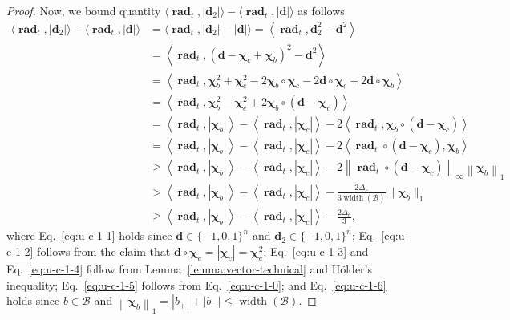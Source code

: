 \documentclass{article}
\newcommand{\B}{\mathcal B}
\DeclareMathOperator{\rank}{width}
\DeclareMathOperator{\rad}{rad}
\newcommand{\nor}[1]{\left\|#1\right\|}
\renewcommand{\vec}[1]{\boldsymbol{#1}}
\renewcommand{\odot}{\circ}
\begin{document}
\begin{proof}
Now, we bound  quantity $\langle \vec \rad_t, |\vec d_2| \rangle - \langle \vec \rad_t, |\vec d| \rangle$ as follows
\begin{align}
\langle \vec \rad_t, |\vec d_2| \rangle - \langle \vec \rad_t, |\vec d| \rangle &=
\langle \vec \rad_t, |\vec d_2|-|\vec d| \rangle = \left\langle \vec \rad_t, \vec d_2^2- \vec d^2 \right\rangle
\label{eq:u-c-1-1} \\
&= \left\langle \vec \rad_t, (\vec d-\vec \chi_c+\vec \chi_b)^2- \vec d^2 \right\rangle 
\nonumber \\
&= \left\langle \vec \rad_t, \vec \chi_b^2+\vec \chi_c^2-2\vec \chi_b\odot \vec \chi_c -
						  2\vec d \odot \vec \chi_c + 2\vec d\odot\vec \chi_b \right\rangle
\nonumber \\
&= \left\langle \vec \rad_t, \vec \chi_b^2 - \vec \chi_c^2+2\vec \chi_b\odot (\vec d-\vec \chi_c)\right\rangle
\label{eq:u-c-1-2}\\
&= \left\langle \vec \rad_t, |\vec\chi_b| \right\rangle
  -\left\langle \vec \rad_t, |\vec\chi_c| \right\rangle
  -2\left\langle \vec \rad_t, \vec \chi_b\odot (\vec d-\vec \chi_c) \right\rangle
  \nonumber \\
&= \left\langle \vec \rad_t, |\vec\chi_b| \right\rangle
  -\left\langle \vec \rad_t, |\vec\chi_c| \right\rangle
  -2\left\langle \vec \rad_t \odot (\vec d-\vec \chi_c), \vec \chi_b \right\rangle
  \label{eq:u-c-1-3}\\  
& \ge \left\langle \vec \rad_t, |\vec\chi_b| \right\rangle
  -\left\langle \vec \rad_t, |\vec\chi_c| \right\rangle
  -2\left\|\vec \rad_t \odot (\vec d-\vec \chi_c)\right\|_\infty \left\| \vec \chi_b\right\|_1
  \label{eq:u-c-1-4} \\
& > \left\langle \vec \rad_t, |\vec\chi_b| \right\rangle
  -\left\langle \vec \rad_t, |\vec\chi_c| \right\rangle
  -\frac{2\Delta_e}{3\rank(\B)} \|\vec\chi_b\|_1 
  \label{eq:u-c-1-5}\\
& \ge \left\langle \vec \rad_t, |\vec\chi_b| \right\rangle
  -\left\langle \vec \rad_t, |\vec\chi_c| \right\rangle
  -\frac{2\Delta_e}{3}
  \label{eq:u-c-1-6},
\end{align}
where Eq.~\eqref{eq:u-c-1-1} holds since $\vec d\in \{-1,0,1\}^n$ and $\vec d_2\in \{-1,0,1\}^n$;
Eq.~\eqref{eq:u-c-1-2} follows from the claim that $\vec d \odot \vec \chi_c = |\vec \chi_c|=\vec\chi_c^2$;
Eq.~\eqref{eq:u-c-1-3} and Eq.~\eqref{eq:u-c-1-4} follow from Lemma~\ref{lemma:vector-technical} and H\"older's inequality;
Eq.~\eqref{eq:u-c-1-5} follows from Eq.~\eqref{eq:u-c-1-0};
and Eq.~\eqref{eq:u-c-1-6} holds since $b\in\B$ and $\nor{\vec\chi_b}_1 = |b_+|+|b_-| \le \rank(\B)$.


\end{proof}
\end{document}
